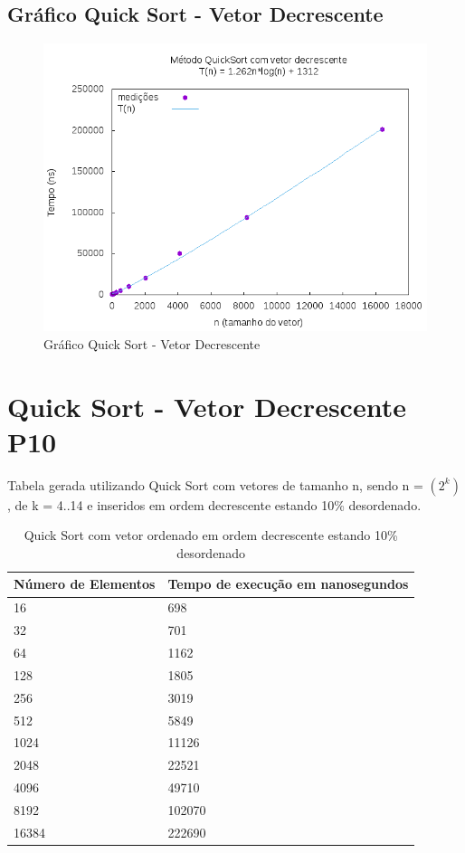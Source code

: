 \documentclass[12pt,a4paper,twoside]{report}
\begin{document}
\subsection{Gráfico Quick Sort - Vetor Decrescente}
\begin{figure}[H]
    \centering
    \includegraphics[width=0.7\linewidth]{graficos/QuickSort/vIntDecrescente/vIntDecrescente.png}
  \caption{Gráfico Quick Sort - Vetor Decrescente}
\end{figure}

\section{Quick Sort - Vetor Decrescente P10}
Tabela gerada utilizando Quick Sort com vetores de tamanho n, sendo n = $(2^k)$, de k = 4..14 e inseridos em ordem decrescente estando 10\% desordenado.
\begin{table}[H]
\centering
\caption{Quick Sort com vetor ordenado em ordem decrescente estando 10\% desordenado}
\label{my-label}
\begin{tabular}{|l|l|}
\hline
\multicolumn{1}{|c|}{\textbf{Número de Elementos}} & \multicolumn{1}{c|}{\textbf{Tempo de execução em nanosegundos}} \\ \hline
16 & 698 \\ \hline
32 & 701 \\ \hline
64 & 1162 \\ \hline
128 & 1805 \\ \hline
256 & 3019 \\ \hline
512 & 5849 \\ \hline
1024 & 11126 \\ \hline
2048 & 22521 \\ \hline
4096 & 49710 \\ \hline
8192 & 102070 \\ \hline
16384 & 222690 \\ \hline
\end{tabular}
\end{table}
\end{document}
